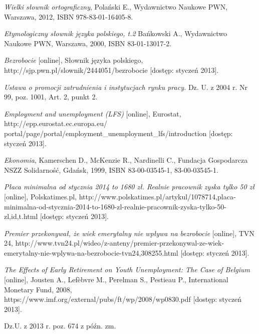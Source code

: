 \documentclass[12pt]{article}
\begin{document}
\begin{thebibliography}{9}
 \small
 
  \emph{Wielki słownik ortograficzny},
  Polański E.,
  Wydawnictwo Naukowe PWN,
  Warszawa,
  2012,
  ISBN 978-83-01-16405-8.
 
  \emph{Etymologiczny słownik języka polskiego, t.2}
  Bańkowski A.,
  Wydawnictwo Naukowe PWN,
  Warszawa,
  2000,
  ISBN 83-01-13017-2.
 
  \emph{Bezrobocie} [online],
  Słownik języka polskiego,
  http://sjp.pwn.pl/slownik/2444051/bezrobocie [dostęp: styczeń 2013].
 
  \emph{Ustawa o promocji zatrudnienia i instytucjach rynku pracy.}
  Dz. U. z 2004 r. Nr 99, poz. 1001, Art. 2, punkt 2.
 
  \emph{Employment and unemployment (LFS)} [online],
  Eurostat,
  http://epp.eurostat.ec.europa.eu/\\portal/page/portal/employment\_unemployment\_lfs/introduction [dostęp: styczeń 2013].
 
  \emph{Ekonomia},
  Kamerschen D., McKenzie R., Nardinelli C.,
  Fundacja Gospodarcza NSZZ Solidarność,
  Gdańsk,
  1999,
  ISBN 83-00-03545-1, 83-00-03545-1.
 
  \emph{Płaca minimalna od stycznia 2014 to 1680 zł. Realnie pracownik zyska tylko 50 zł} [online],
  Polskatimes.pl,
  http://www.polskatimes.pl/artykul/1078714,placa-minimalna-od-stycznia-2014-to-1680-zl-realnie-pracownik-zyska-tylko-50-zl,id,t.html [dostęp: styczeń 2013].
  
  \emph{Premier przekonywał, że wiek emerytalny nie wpływa na bezrobocie} [online],
  TVN 24,
  http://www.tvn24.pl/wideo/z-anteny/premier-przekonywal-ze-wiek-emerytalny-nie-wplywa-na-bezrobocie-tvn24,308255.html [dostęp: styczeń 2013].
 
  \emph{The Effects of Early Retirement on Youth Unemployment: The Case of Belgium} [online],
  Jousten A., Lefèbvre M., Perelman S., Pestieau P.,
  International Monetary Fund,
  2008,
  https://www.imf.org/external/pubs/ft/wp/2008/wp0830.pdf  [dostęp: styczeń 2013].
 
  Dz.U. z 2013 r. poz. 674 z późn. zm.
  
\end{thebibliography}
    
\end{document}
